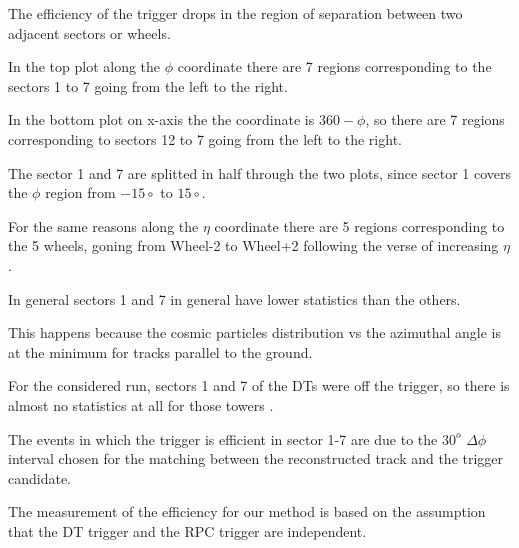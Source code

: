 The efficiency of the trigger drops in the region of separation
between two adjacent sectors or wheels.

In the top plot along the $\phi$ coordinate there are 7 regions
 corresponding to the sectors 1 to 7 going from the left to the right.

In the bottom plot on x-axis the the coordinate is $360 - \phi$,
so there are 7 regions corresponding to sectors 12 to 7 
going from the left to the right.

The sector 1 and 7 are splitted in half through the two plots,
 since sector 1 covers the $\phi$
region from $-15\circ$ to $15\circ$. 

For the same reasons along the $\eta$ coordinate 
there are 5 regions corresponding to the 5 wheels,
goning from Wheel-2 to Wheel+2 following the verse of 
increasing $\eta$. 




In general sectors 1 and 7 in general have 
lower statistics than the others.

This happens because the cosmic particles
distribution vs the azimuthal angle
is at the minimum for tracks
parallel to the ground.

For the considered run, sectors 1 and 7 of the DTs were off the trigger,
so there is almost no statistics at all for those towers .

The events in which the trigger is efficient in sector 1-7 are due
to the  $30^o$   $\Delta \phi$ interval chosen for the matching 
between the reconstructed track and the trigger candidate.








The measurement of the efficiency for our method is based on the assumption that 
the DT trigger and the RPC trigger are independent.


